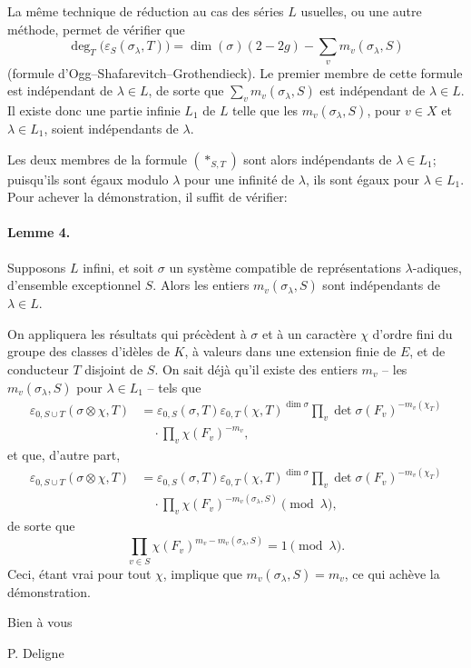 \documentclass[11pt]{article}
\newcommand{\dimn}{\operatorname{dim}}
\newcommand{\eps}{\varepsilon}
\begin{document}
La même technique de réduction au cas des séries $L$ usuelles, ou une autre méthode, permet de vérifier que
\[
 \deg_T\bigl(\eps_S(\sigma_\lambda,T)\bigr)
 =\dimn(\sigma)(2-2g)-\sum_v m_v(\sigma_\lambda,S)
\]
(formule d'Ogg--Shafarevitch--Grothendieck). Le premier membre de cette formule est indépendant de $\lambda\in L$, de sorte que $\sum_v m_v(\sigma_\lambda,S)$ est indépendant de $\lambda\in L$. Il existe donc une partie infinie $L_1$ de $L$ telle que les $m_v(\sigma_\lambda,S)$, pour $v\in X$ et $\lambda\in L_1$, soient indépendants de $\lambda$.

Les deux membres de la formule $(*_{S,T})$ sont alors indépendants de $\lambda\in L_1$; puisqu'ils sont égaux modulo $\lambda$ pour une infinité de $\lambda$, ils sont égaux pour $\lambda\in L_1$. Pour achever la démonstration, il suffit de vérifier:

\paragraph{Lemme 4.} Supposons $L$ infini, et soit $\sigma$ un système compatible de représentations $\lambda$-adiques, d'ensemble exceptionnel $S$. Alors les entiers $m_v(\sigma_\lambda,S)$ sont indépendants de $\lambda\in L$.

On appliquera les résultats qui précèdent à $\sigma$ et à un caractère $\chi$ d'ordre fini du groupe des classes d'idèles de $K$, à valeurs dans une extension finie de $E$, et de conducteur $T$ disjoint de $S$. On sait déjà qu'il existe des entiers $m_v$ -- les $m_v(\sigma_\lambda,S)$ pour $\lambda\in L_1$ -- tels que
\[
\begin{aligned}
 \eps_{0,S\cup T}(\sigma\otimes\chi,T)
 &=\eps_{0,S}(\sigma,T)\eps_{0,T}(\chi,T)^{\dimn\sigma}
 \prod_v \det\sigma(F_v)^{-m_v(\chi_T)}\\
 &\quad\cdot \prod_v \chi(F_v)^{-m_v},
\end{aligned}
\]
et que, d'autre part,
\[
\begin{aligned}
 \eps_{0,S\cup T}(\sigma\otimes\chi,T)
 &=\eps_{0,S}(\sigma,T)\eps_{0,T}(\chi,T)^{\dimn\sigma}
 \prod_v \det\sigma(F_v)^{-m_v(\chi_T)}\\
 &\quad\cdot \prod_v \chi(F_v)^{-m_v(\sigma_\lambda,S)}
 \pmod{\lambda},
\end{aligned}
\]
de sorte que
\[
 \prod_{v\in S}\chi(F_v)^{m_v-m_v(\sigma_\lambda,S)}=1\pmod{\lambda}.
\]
Ceci, étant vrai pour tout $\chi$, implique que $m_v(\sigma_\lambda,S)=m_v$, ce qui achève la démonstration.

\vspace{1cm}
\begin{center}
Bien à vous

\vspace{0.5cm}
P. Deligne
\end{center}
\end{document}
